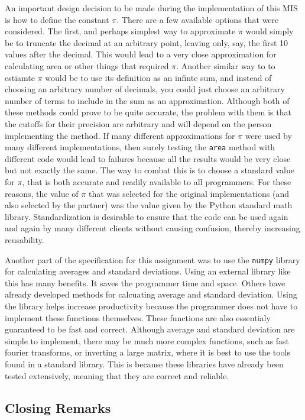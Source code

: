 \documentclass[12pt]{article}
\begin{document}
An important design decision to be made during the implementation of this MIS is how to define the constant $\pi$. There are a few available options that were considered. The first, and perhaps simplest way to approximate $\pi$ would simply be to truncate the decimal at an arbitrary point, leaving only, say, the first 10 values after the decimal. This would lead to a very close approximation for calculating area or other things that required $\pi$. Another similar way to to estiamte $\pi$ would be to use its definition as an infinte sum, and instead of choosing an arbitrary number of decimals, you could just choose an arbitrary number of terms to include in the sum as an approximation. Although both of these methods could prove to be quite accurate, the problem with them is that the cutoffs for their precision are arbitrary and will depend on the person implementing the method. If many different approximations for $\pi$ were used by many different implementations, then surely testing the {\tt area} method with different code would lead to failures because all the results would be very close but not exactly the same. The way to combat this is to choose a standard value for $\pi$, that is both accurate and readily available to all programmers. For these reasons, the value of $\pi$ that was selected for the original implementations (and also selected by the partner) was the value given by the Python standard math library. Standardization is desirable to ensure that the code can be used again and again by many different clients without causing confusion, thereby increasing reusability.

Another part of the specification for this assignment was to use the {\tt numpy} library for calculating averages and standard deviations. Using an external library like this has many benefits. It saves the programmer time and space. Others have already developed methods for calcuating average and standard deviation. Using the library helps increase productivity because the programmer does not have to implement these functions themselves. These functions are also essentialy guaranteed to be fast and correct. Although average and standard deviation are simple to implement, there may be much more complex functions, such as fast fourier transforms, or inverting a large matrix, where it is best to use the tools found in a standard library. This is because these libraries have already been tested extensively, meaning that they are correct and reliable. 

\subsection{Closing Remarks}
\end{document}
